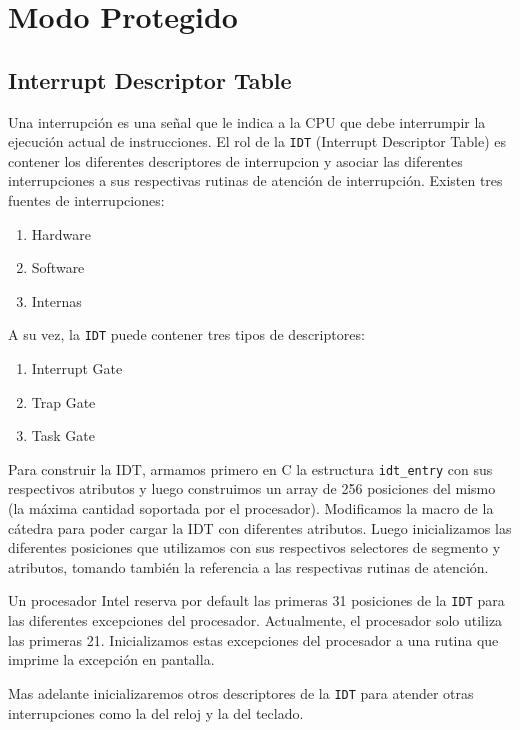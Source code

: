 \section{Modo Protegido}

\subsection{Interrupt Descriptor Table}

Una interrupción es una señal que le indica a la CPU que debe interrumpir la ejecución actual de instrucciones. El rol de la \texttt{IDT} (Interrupt Descriptor Table) es contener los diferentes descriptores de interrupcion y asociar las diferentes interrupciones a sus respectivas rutinas de atención de interrupción. Existen tres fuentes de interrupciones:

\begin{enumerate}
\item Hardware
\item Software
\item Internas
\end{enumerate}

A su vez, la \texttt{IDT} puede contener tres tipos de descriptores:

\begin{enumerate}
\item Interrupt Gate
\item Trap Gate
\item Task Gate
\end{enumerate}

Para construir la IDT, armamos primero en C la estructura \texttt{idt\_entry} con sus respectivos atributos y luego construimos un array de 256 posiciones del mismo (la máxima cantidad soportada por el procesador). Modificamos la macro de la cátedra para poder cargar la IDT con diferentes atributos. Luego inicializamos las diferentes posiciones que utilizamos con sus respectivos selectores de segmento y atributos, tomando también la referencia a las respectivas rutinas de atención.

Un procesador Intel reserva por default las primeras 31 posiciones de la \texttt{IDT} para las diferentes excepciones del procesador. Actualmente, el procesador solo utiliza las primeras 21. Inicializamos estas excepciones del procesador a una rutina que imprime la excepción en pantalla.

Mas adelante inicializaremos otros descriptores de la \texttt{IDT} para atender otras interrupciones como la del reloj y la del teclado.

